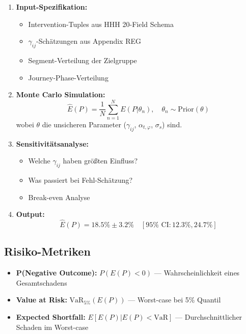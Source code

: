 \begin{enumerate}
\item \textbf{Input-Spezifikation:}
   \begin{itemize}[nosep]
   \item Intervention-Tuples aus HHH 20-Field Schema
   \item $\gamma_{ij}$-Schätzungen aus Appendix REG
   \item Segment-Verteilung der Zielgruppe
   \item Journey-Phase-Verteilung
   \end{itemize}

\item \textbf{Monte Carlo Simulation:}
\begin{equation}
\hat{E}(P) = \frac{1}{N} \sum_{n=1}^{N} E(P | \theta_n), \quad \theta_n \sim \text{Prior}(\theta)
\label{eq:20-monte-carlo}
\end{equation}
wobei $\theta$ die unsicheren Parameter ($\gamma_{ij}$, $\alpha_{t,\varphi}$, $\sigma_s$) sind.

\item \textbf{Sensitivitätsanalyse:}
   \begin{itemize}[nosep]
   \item Welche $\gamma_{ij}$ haben größten Einfluss?
   \item Was passiert bei Fehl-Schätzung?
   \item Break-even Analyse
   \end{itemize}

\item \textbf{Output:}
\begin{equation}
\hat{E}(P) = 18.5\% \pm 3.2\% \quad [95\% \text{ CI}: 12.3\%, 24.7\%]
\label{eq:20-simulation-output}
\end{equation}
\end{enumerate}

\subsection{Risiko-Metriken}

\begin{itemize}
\item \textbf{P(Negative Outcome):} $P(E(P) < 0)$ --- Wahrscheinlichkeit eines Gesamtschadens
\item \textbf{Value at Risk:} $\text{VaR}_{5\%}(E(P))$ --- Worst-case bei 5\% Quantil
\item \textbf{Expected Shortfall:} $E[E(P) | E(P) < \text{VaR}]$ --- Durchschnittlicher Schaden im Worst-case
\end{itemize}


